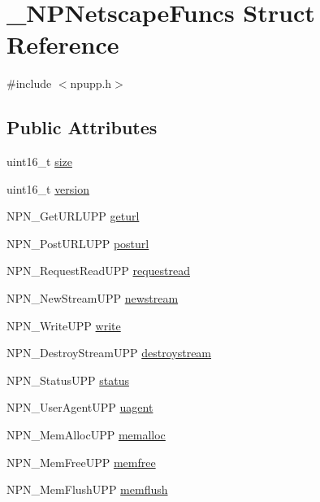 \hypertarget{struct___n_p_netscape_funcs}{
\section{\_\-NPNetscapeFuncs Struct Reference}
\label{struct___n_p_netscape_funcs}
}


{\ttfamily \#include $<$npupp.h$>$}

\subsection*{Public Attributes}
\begin{DoxyCompactItemize}
\item 
uint16\_\-t \hyperlink{struct___n_p_netscape_funcs_ae42a298a051cff335a2fef0f1ffd1fdb}{size}
\item 
uint16\_\-t \hyperlink{struct___n_p_netscape_funcs_a86d9a0fc8a59532aca76b188920b253f}{version}
\item 
NPN\_\-GetURLUPP \hyperlink{struct___n_p_netscape_funcs_ad4c72959fe044df64499e35f18991987}{geturl}
\item 
NPN\_\-PostURLUPP \hyperlink{struct___n_p_netscape_funcs_a4ab71f86b7c6f444afa64dec6f7ba76f}{posturl}
\item 
NPN\_\-RequestReadUPP \hyperlink{struct___n_p_netscape_funcs_a8e7709c440b46b66a5f5e47006b3a9b1}{requestread}
\item 
NPN\_\-NewStreamUPP \hyperlink{struct___n_p_netscape_funcs_afe8b90e6099d477f62d78dd1ceb22e81}{newstream}
\item 
NPN\_\-WriteUPP \hyperlink{struct___n_p_netscape_funcs_acba5d605d7ce8877eac02c6791194c93}{write}
\item 
NPN\_\-DestroyStreamUPP \hyperlink{struct___n_p_netscape_funcs_a2cf0d236a9bde9312b5241e282419403}{destroystream}
\item 
NPN\_\-StatusUPP \hyperlink{struct___n_p_netscape_funcs_a8cbd5081e68ebbbfada3a825f0383645}{status}
\item 
NPN\_\-UserAgentUPP \hyperlink{struct___n_p_netscape_funcs_a03b50f7c28ca7a833972e367ec9c5593}{uagent}
\item 
NPN\_\-MemAllocUPP \hyperlink{struct___n_p_netscape_funcs_a5097004a4e957a8a19b8dab5b621d6a5}{memalloc}
\item 
NPN\_\-MemFreeUPP \hyperlink{struct___n_p_netscape_funcs_a2a3ffd689c7d1b70e6ed94e5fafb50c6}{memfree}
\item 
NPN\_\-MemFlushUPP \hyperlink{struct___n_p_netscape_funcs_a5f7f7c54b1e720d7f3321d6e4e9e43ea}{memflush}

\end{DoxyCompactItemize}
